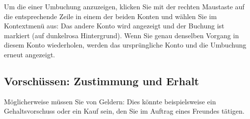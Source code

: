 Um die  einer Umbuchung anzuzeigen, klicken Sie mit der rechten Maustaste auf die entsprechende Zeile in einem der beiden Konten und wählen Sie im Kontextmenü  aus: Das andere Konto wird angezeigt und der Buchung ist markiert (auf {\setlength{\fboxsep}{2pt}\colorbox[RGB]{245,155,155}{dunkelrosa Hintergrund}}). Wenn Sie genau denselben Vorgang in diesem Konto wiederholen, werden das ursprüngliche Konto und die Umbuchung erneut angezeigt.


\subsection{Vorschüssen: Zustimmung und Erhalt\label{transactions-new-advance}}

Möglicherweise müssen Sie  von Geldern: Dies könnte beispielsweise ein Gehaltsvorschuss oder ein Kauf sein, den Sie im Auftrag eines Freundes tätigen.

